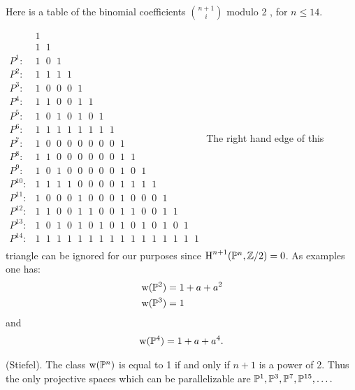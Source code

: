 \documentclass[../main]{subfiles}
\begin{document}
Here is a table of the binomial coefficients $\binom{n+1}{i}$ modulo 2 , for $n \leq 14$.

{
\newcommand{\hs}{\hspace{7pt}}
$
\begin{array}{lc}
         & 1 \\
         & 1 \hs 1 \\
 P^1:    & 1 \hs 0 \hs 1 \\
 P^2:    & 1 \hs 1 \hs 1 \hs 1 \\
 P^3:    & 1 \hs 0 \hs 0 \hs 0 \hs 1 \\
 P^4:    & 1 \hs 1 \hs 0 \hs 0 \hs 1 \hs 1 \\
 P^5:    & 1 \hs 0 \hs 1 \hs 0 \hs 1 \hs 0 \hs 1 \\
 P^6:    & 1 \hs 1 \hs 1 \hs 1 \hs 1 \hs 1 \hs 1 \hs 1 \\
 P^7:    & 1 \hs 0 \hs 0 \hs 0 \hs 0 \hs 0 \hs 0 \hs 0 \hs 1 \\
 P^8:    & 1 \hs 1 \hs 0 \hs 0 \hs 0 \hs 0 \hs 0 \hs 0 \hs 1 \hs 1 \\
 P^9:    & 1 \hs 0 \hs 1 \hs 0 \hs 0 \hs 0 \hs 0 \hs 0 \hs 1 \hs 0 \hs 1 \\
 P^{10}: & 1 \hs 1 \hs 1 \hs 1 \hs 0 \hs 0 \hs 0 \hs 0 \hs 1 \hs 1 \hs 1 \hs 1 \\
 P^{11}: & 1 \hs 0 \hs 0 \hs 0 \hs 1 \hs 0 \hs 0 \hs 0 \hs 1 \hs 0 \hs 0 \hs 0 \hs 1 \\
 P^{12}: & 1 \hs 1 \hs 0 \hs 0 \hs 1 \hs 1 \hs 0 \hs 0 \hs 1 \hs 1 \hs 0 \hs 0 \hs 1 \hs 1 \\
 P^{13}: & 1 \hs 0 \hs 1 \hs 0 \hs 1 \hs 0 \hs 1 \hs 0 \hs 1 \hs 0 \hs 1 \hs 0 \hs 1 \hs 0 \hs 1 \\
 P^{14}: & 1 \hs 1 \hs 1 \hs 1 \hs 1 \hs 1 \hs 1 \hs 1 \hs 1 \hs 1 \hs 1 \hs 1 \hs 1 \hs 1 \hs 1 \hs 1 \\
\end{array}
$
}
\phantom{,}\newline\phantom{,}\newline
The right hand edge of this triangle can be ignored for our purposes since $\operatorname{H}^{n+1}(\mathbb{P}^{n}, \mathbb{Z} / 2)=0$. As examples one has:
\[
\begin{aligned}
&\operatorname{w}(\mathbb{P}^{2})=1+a+a^{2} \\
&\operatorname{w}(\mathbb{P}^{3})=1
\end{aligned}
\]
and
\[
\begin{aligned}
\operatorname{w}(\mathbb{P}^{4})=1+a+a^{4}.
\end{aligned}
\]
\begin{corollary} (Stiefel).
 The class $\operatorname{w}(\mathbb{P}^{n})$ is equal to 1 if and only if $n+1$ is a power of 2. Thus the only projective spaces which can be parallelizable are $\mathbb{P}^{1}, \mathbb{P}^{3}, \mathbb{P}^{7}, \mathbb{P}^{15}, \ldots .$
\end{corollary}
\end{document}
